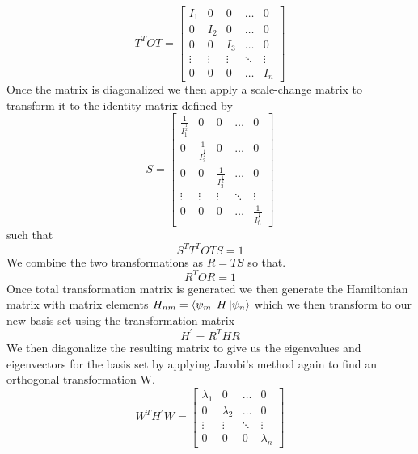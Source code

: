 \begin{equation}
     T^{T}OT=\begin{bmatrix}
     I_{1}       & 0      & 0      &\hdots   & 0     \\
     0           & I_{2}  & 0      &\hdots   & 0     \\
     0           & 0      & I_{3}  &\hdots   & 0     \\  
    \vdots       & \vdots &\vdots  &\ddots   &\vdots \\  
     0           & 0      & 0      &\hdots   & I_{n} 
    \end{bmatrix}
 \end{equation}
Once the matrix is diagonalized we then apply a scale-change matrix to transform it to the identity matrix defined by
\begin{equation}
    S=\begin{bmatrix}
     \frac{1}{I_{1}^{\frac{1}{2}}}       & 0      & 0      &\hdots   & 0     \\
     0            &  \frac{1}{I_{2}^{\frac{1}{2}}}  & 0      &\hdots   & 0     \\
     0            & 0      &  \frac{1}{I_{3}^{\frac{1}{2}}}  &\hdots   & 0     \\  
     \vdots       & \vdots & \vdots  & \ddots  & \vdots \\  
     0            & 0      & 0       &\hdots   & \frac{1}{I_{n}^{\frac{1}{2}}} 
    
    
    \end{bmatrix}
\end{equation}
such that
\begin{equation}
    S^{T}T^{T}OTS=1
\end{equation}
We combine the two transformations as \(R=TS\) so that.
\begin{equation}
    R^{T}OR=1
\end{equation}
Once total transformation matrix is generated we then generate the Hamiltonian matrix with matrix elements \(H_{nm}=\bra{\psi_{m}}H\ket{\psi_{n}}\) which we then transform to our new basis set using the transformation matrix
\begin{equation}
    H^{\prime}=R^{T}HR
\end{equation}
We then diagonalize the resulting matrix to give us the eigenvalues and eigenvectors for the basis set by applying Jacobi's method again to find an orthogonal transformation W.
\begin{equation}
    W^{T}H^{\prime}W=\begin{bmatrix}
    \lambda_{1} &0             &\hdots    &0 \\
    0           &\lambda_{2}   &\hdots    &0 \\
    \vdots      &\vdots        &\ddots    &\vdots \\
    0           &0             &0         &\lambda_{n}
    
    
                     \end{bmatrix}
\end{equation}
